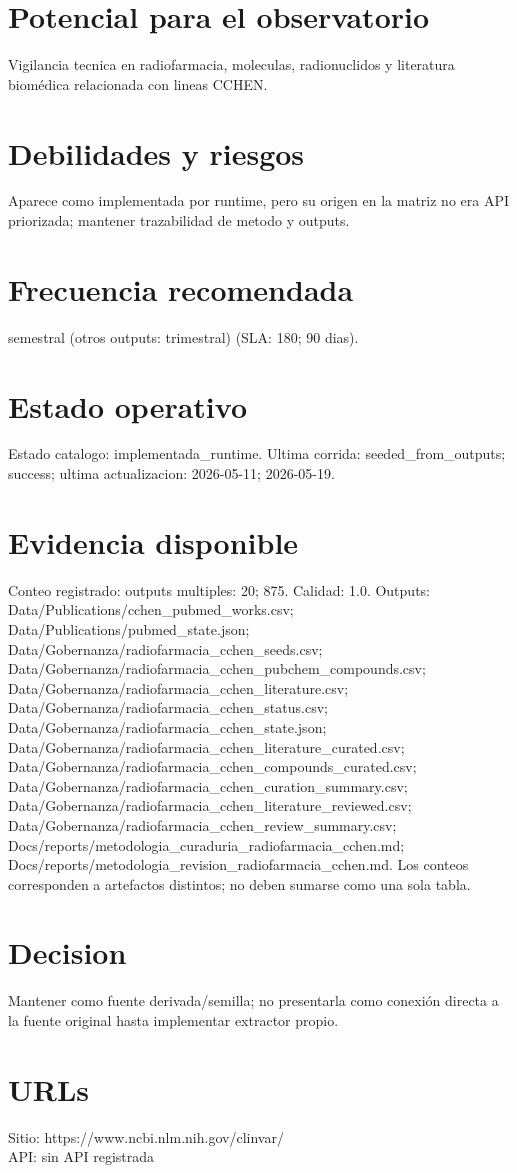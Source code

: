 \documentclass[10pt,a4paper]{article}
\begin{document}
\section*{Potencial para el observatorio}
Vigilancia tecnica en radiofarmacia, moleculas, radionuclidos y literatura biomédica relacionada con lineas CCHEN.

\section*{Debilidades y riesgos}
Aparece como implementada por runtime, pero su origen en la matriz no era API priorizada; mantener trazabilidad de metodo y outputs.

\section*{Frecuencia recomendada}
semestral (otros outputs: trimestral) (SLA: 180; 90 dias).

\section*{Estado operativo}
Estado catalogo: implementada\_runtime. Ultima corrida: seeded\_from\_outputs; success; ultima actualizacion: 2026-05-11; 2026-05-19.

\section*{Evidencia disponible}
Conteo registrado: outputs multiples: 20; 875. Calidad: 1.0. Outputs: Data/Publications/cchen\_pubmed\_works.csv; Data/Publications/pubmed\_state.json; Data/Gobernanza/radiofarmacia\_cchen\_seeds.csv; Data/Gobernanza/radiofarmacia\_cchen\_pubchem\_compounds.csv; Data/Gobernanza/radiofarmacia\_cchen\_literature.csv; Data/Gobernanza/radiofarmacia\_cchen\_status.csv; Data/Gobernanza/radiofarmacia\_cchen\_state.json; Data/Gobernanza/radiofarmacia\_cchen\_literature\_curated.csv; Data/Gobernanza/radiofarmacia\_cchen\_compounds\_curated.csv; Data/Gobernanza/radiofarmacia\_cchen\_curation\_summary.csv; Data/Gobernanza/radiofarmacia\_cchen\_literature\_reviewed.csv; Data/Gobernanza/radiofarmacia\_cchen\_review\_summary.csv; Docs/reports/metodologia\_curaduria\_radiofarmacia\_cchen.md; Docs/reports/metodologia\_revision\_radiofarmacia\_cchen.md. Los conteos corresponden a artefactos distintos; no deben sumarse como una sola tabla.

\section*{Decision}
Mantener como fuente derivada/semilla; no presentarla como conexión directa a la fuente original hasta implementar extractor propio.


\section*{URLs}
Sitio: https://www.ncbi.nlm.nih.gov/clinvar/\\
API: sin API registrada
\end{document}
